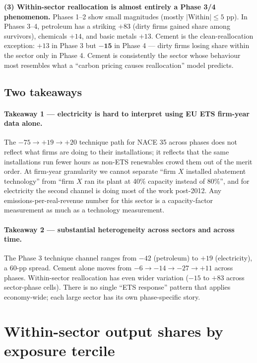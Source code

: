 \documentclass[11pt]{article}
\begin{document}
\textbf{(3) Within-sector reallocation is almost entirely a Phase 3/4 phenomenon.} Phases 1--2 show small magnitudes (mostly $|$Within$|\leq 5$ pp). In Phases 3--4, petroleum has a striking $+83$ (dirty firms gained share among survivors), chemicals $+14$, and basic metals $+13$. Cement is the clean-reallocation exception: $+13$ in Phase 3 but $\mathbf{-15}$ in Phase 4 --- dirty firms losing share within the sector only in Phase 4. Cement is consistently the sector whose behaviour most resembles what a ``carbon pricing causes reallocation'' model predicts.

\subsection{Two takeaways}

\paragraph{Takeaway 1 --- electricity is hard to interpret using EU ETS firm-year data alone.} The $-75 \to +19 \to +20$ technique path for NACE 35 across phases does not reflect what firms are doing to their installations; it reflects that the same installations run fewer hours as non-ETS renewables crowd them out of the merit order. At firm-year granularity we cannot separate ``firm $X$ installed abatement technology'' from ``firm $X$ ran its plant at 40\% capacity instead of 80\%'', and for electricity the second channel is doing most of the work post-2012. Any emissions-per-real-revenue number for this sector is a capacity-factor measurement as much as a technology measurement.

\paragraph{Takeaway 2 --- substantial heterogeneity across sectors and across time.} The Phase 3 technique channel ranges from $-42$ (petroleum) to $+19$ (electricity), a 60-pp spread. Cement alone moves from $-6 \to -14 \to -27 \to +11$ across phases. Within-sector reallocation has even wider variation ($-15$ to $+83$ across sector-phase cells). There is no single ``ETS response'' pattern that applies economy-wide; each large sector has its own phase-specific story.

\section{Within-sector output shares by exposure tercile}
\end{document}
